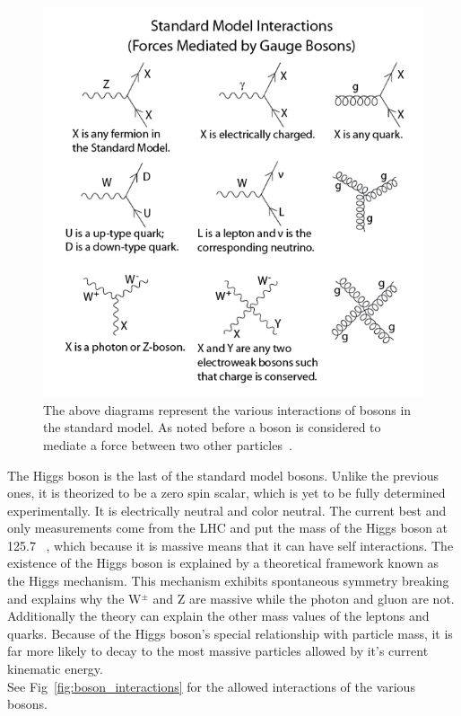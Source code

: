   \begin{figure}[h]
\begin{center}
\includegraphics[width=0.8\linewidth]{Figs/SM_force_mediation.png}
\caption{\label{fig:sm_force_meidation}
 The above diagrams represent the various interactions of bosons in the standard model. As noted before a boson is considered to mediate a force between two other particles~\cite{wikimediations}.
}
\end{center}
\end{figure}
 
 The Higgs boson is the last of the standard model bosons. Unlike the previous ones, it is theorized to be a zero spin scalar, which is yet to be fully determined experimentally. It is electrically neutral and color neutral. The current best and only measurements come from the LHC and put the mass of the Higgs boson at 125.7 \GeVcc~\cite{discovery, higgstwiki}, which because it is massive means that it can have self interactions. The existence of the Higgs boson is explained by a theoretical framework known as the Higgs mechanism. This mechanism exhibits spontaneous symmetry breaking and explains why the W$^{\pm}$ and Z are massive while the photon and gluon are not. Additionally the theory can explain the other mass values of the leptons and quarks. Because of the Higgs boson's special relationship with particle mass, it is far more likely to decay to the most massive particles allowed by it's current kinematic energy.\\ 
 
 
 See Fig~\ref{fig:boson_interactions} for the allowed interactions of the various bosons.
 

